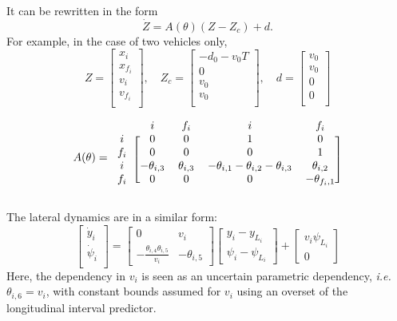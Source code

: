 It can be rewritten in the form $$\dot{Z} = A(\theta)(Z-Z_c) + d.$$ For example, in the case of two vehicles only,
\begin{equation*}
Z = \begin{bmatrix}
x_i \\
x_{f_i} \\
v_i \\
v_{f_i} \\
\end{bmatrix}
,\quad
Z_c = \begin{bmatrix}
-d_0-v_0 T \\
0 \\
v_0\\
v_0 \\
\end{bmatrix}
,\quad
d = \begin{bmatrix}
v_0 \\
v_0 \\
0\\
0\\
\end{bmatrix}
\end{equation*}

\begin{equation*}
A(\theta)
=
\begin{blockarray}{ccccc}
& i & f_i & i & f_i \\
\begin{block}{c[cccc]}
i & 0 & 0 & 1 & 0 \\
f_i & 0 & 0 & 0 & 1 \\
i & -\theta_{i,3} & \theta_{i,3} & -\theta_{i,1}-\theta_{i,2}-\theta_{i,3} & \theta_{i,2} \\
f_i & 0 & 0 & 0 & -\theta_{f_i,1} \\
\end{block}
\end{blockarray}
\end{equation*}

The lateral dynamics are in a similar form:
\begin{equation*}
\begin{bmatrix}
\dot{y}_i \\
\dot{\psi}_i \\
\end{bmatrix}
=
\begin{bmatrix}
0 & v_i \\
-\frac{\theta_{i,4} \theta_{i,5}}{v_i} & -\theta_{i,5}
\end{bmatrix}
\begin{bmatrix}
y_i - y_{L_i} \\
\psi_i - \psi_{L_i}
\end{bmatrix}
+
\begin{bmatrix}
v_i\psi_{L_i} \\
0
\end{bmatrix}
\end{equation*}
Here, the dependency in $v_i$ is seen as an uncertain parametric dependency, \emph{i.e.} $\theta_{i,6}=v_i$, with constant bounds assumed for $v_i$ using an overset of the longitudinal interval predictor.

